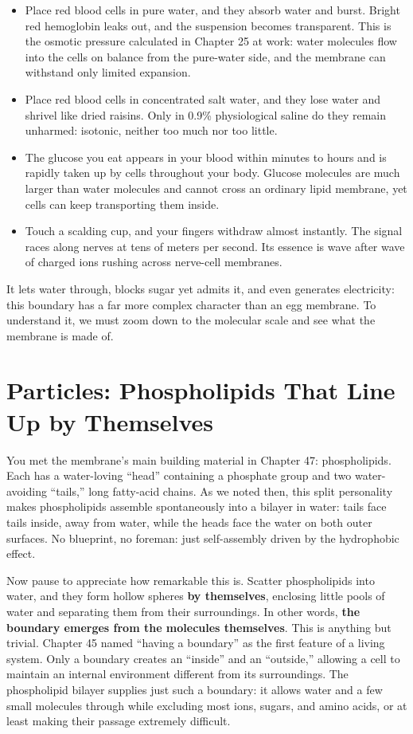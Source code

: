 \begin{itemize}[itemsep=2pt]
\item Place red blood cells in pure water, and they absorb water and burst. Bright red hemoglobin leaks out, and the suspension becomes transparent. This is the osmotic pressure calculated in Chapter 25 at work: water molecules flow into the cells on balance from the pure-water side, and the membrane can withstand only limited expansion.
\item Place red blood cells in concentrated salt water, and they lose water and shrivel like dried raisins. Only in 0.9\% physiological saline do they remain unharmed: isotonic, neither too much nor too little.
\item The glucose you eat appears in your blood within minutes to hours and is rapidly taken up by cells throughout your body. Glucose molecules are much larger than water molecules and cannot cross an ordinary lipid membrane, yet cells can keep transporting them inside.
\item Touch a scalding cup, and your fingers withdraw almost instantly. The signal races along nerves at tens of meters per second. Its essence is wave after wave of charged ions rushing across nerve-cell membranes.
\end{itemize}

It lets water through, blocks sugar yet admits it, and even generates electricity: this boundary has a far more complex character than an egg membrane. To understand it, we must zoom down to the molecular scale and see what the membrane is made of.

\section{Particles: Phospholipids That Line Up by Themselves}

You met the membrane's main building material in Chapter 47: phospholipids. Each has a water-loving ``head'' containing a phosphate group and two water-avoiding ``tails,'' long fatty-acid chains. As we noted then, this split personality makes phospholipids assemble spontaneously into a bilayer in water: tails face tails inside, away from water, while the heads face the water on both outer surfaces. No blueprint, no foreman: just self-assembly driven by the hydrophobic effect.

Now pause to appreciate how remarkable this is. Scatter phospholipids into water, and they form hollow spheres \textbf{by themselves}, enclosing little pools of water and separating them from their surroundings. In other words, \textbf{the boundary emerges from the molecules themselves}. This is anything but trivial. Chapter 45 named ``having a boundary'' as the first feature of a living system. Only a boundary creates an ``inside'' and an ``outside,'' allowing a cell to maintain an internal environment different from its surroundings. The phospholipid bilayer supplies just such a boundary: it allows water and a few small molecules through while excluding most ions, sugars, and amino acids, or at least making their passage extremely difficult.


